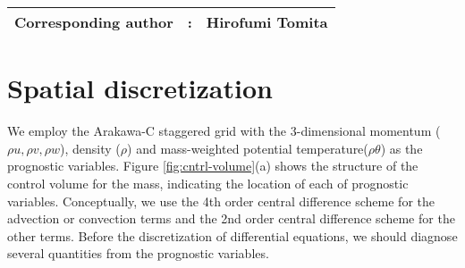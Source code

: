 {\bf \Large
\begin{tabular}{ccc}
\hline
  Corresponding author & : & Hirofumi Tomita\\
\hline
\end{tabular}
}

\section{Spatial discretization}
We employ the Arakawa-C staggered grid with the 3-dimensional momentum
($\rho u, \rho v, \rho w$), density ($\rho$) and mass-weighted potential temperature($\rho \theta$)
as the prognostic variables.
Figure \ref{fig:cntrl-volume}(a) shows the structure of the control volume for the mass,
indicating the location of each of prognostic variables.
Conceptually, we use the 4th order central difference scheme
for the advection or convection terms and
the 2nd order central difference scheme for the other terms.
Before the discretization of differential equations,
we should diagnose several quantities from the prognostic variables.
